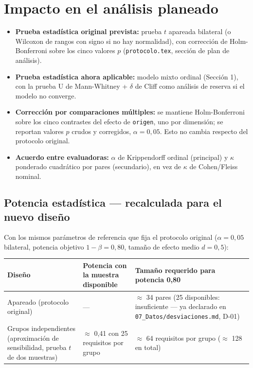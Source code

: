\documentclass[11pt,a4paper]{article}
\begin{document}
\section{Impacto en el análisis planeado}

\begin{itemize}[leftmargin=1.1cm]
  \item \textbf{Prueba estadística original prevista:} prueba $t$ apareada
        bilateral (o Wilcoxon de rangos con signo si no hay normalidad),
        con corrección de Holm-Bonferroni sobre los cinco valores $p$
        (\texttt{protocolo.tex}, sección de plan de análisis).
  \item \textbf{Prueba estadística ahora aplicable:} modelo mixto ordinal
        (Sección 1), con la prueba U de Mann-Whitney + $\delta$ de Cliff
        como análisis de reserva si el modelo no converge.
  \item \textbf{Corrección por comparaciones múltiples:} se mantiene
        Holm-Bonferroni sobre los cinco contrastes del efecto de
        \texttt{origen}, uno por dimensión; se reportan valores $p$ crudos
        y corregidos, $\alpha = 0{,}05$. Esto no cambia respecto del
        protocolo original.
  \item \textbf{Acuerdo entre evaluadoras:} $\alpha$ de Krippendorff
        ordinal (principal) y $\kappa$ ponderado cuadrático por pares
        (secundario), en vez de $\kappa$ de Cohen/Fleiss nominal.
\end{itemize}

\subsection*{Potencia estadística --- recalculada para el nuevo diseño}

Con los mismos parámetros de referencia que fija el protocolo original
($\alpha = 0{,}05$ bilateral, potencia objetivo $1-\beta = 0{,}80$, tamaño
de efecto medio $d = 0{,}5$):

\begin{longtable}{|L{5.2cm}|C{4.7cm}|C{4.7cm}|}
\hline
{}
\textbf{Diseño} & \textbf{Potencia con la muestra disponible} & \textbf{Tamaño requerido para potencia 0,80} \\ \hline
\endhead
Apareado (protocolo original) & --- & $\approx$ 34 pares (25 disponibles: insuficiente --- ya declarado en \texttt{07\_Datos/desviaciones.md}, D-01) \\ \hline
Grupos independientes (aproximación de sensibilidad, prueba $t$ de dos muestras) & $\approx$ 0,41 con 25 requisitos por grupo & $\approx$ 64 requisitos por grupo ($\approx$ 128 en total) \\ \hline
\end{longtable}
\end{document}
